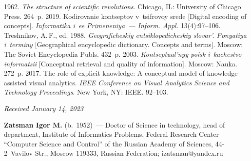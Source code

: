 \begin{multicols}{2}
{{\begin{thebibliography}{99}
\pagebreak

 1962. \textit{The structure of scientific revolutions}. Chicago, IL: University of 
Chicago Press. 264~p.
 2019. Kodirovanie kontseptov v~tsifrovoy srede [Digital encoding of 
concepts]. \textit{Informatika i~ee Primeneniya~--- Inform. Appl.} 13(4):97--106.
Treshnikov, A.\,F., ed. 1988. \textit{Geograficheskiy en\-tsi\-klo\-pe\-di\-che\-skiy slovar'. Ponyatiya 
i~terminy} [Geographical encyclopedic dictionary. Concepts and terms]. Moscow: The Soviet 
Encyclopedia Publs. 432~p.
 2003. \textit{Kontseptual'nyy poisk i~kachestvo informatsii} [Conceptual 
retrieval and quality of information]. Moscow: Nauka. 272~p.
 2017. 
The role of explicit knowledge: A conceptual model of knowledge-assisted visual analytics. 
\textit{IEEE Conference on Visual Analytics Science and Technology Proceedings}.
New York, NY: IEEE. 92--103.
\end{thebibliography}

 }
 }

\end{multicols}

\vspace*{-6pt}

\hfill{\small\textit{Received January 14, 2023}}

\Contrl

\noindent
\textbf{Zatsman Igor M.} (b.\ 1952)~--- Doctor of Science in technology, head of department, 
Institute of Informatics Problems, Federal Research Center ``Computer Science and Control'' of the 
Russian Academy of Sciences, 44-2~Vavilov Str., Moscow 119333, Russian Federation; 
\mbox{izatsman@yandex.ru}

     

\label{end\stat}

\renewcommand{\bibname}{\protect\rm Литература} 